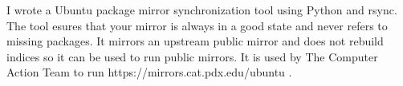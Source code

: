 {
  I wrote a Ubuntu package mirror synchronization tool using Python and rsync. The tool esures that your mirror is always in a good state and never refers to missing packages. It mirrors an upstream public mirror and does not rebuild indices so it can be used to run public mirrors. It is used by The Computer Action Team to run https://mirrors.cat.pdx.edu/ubuntu .
}
